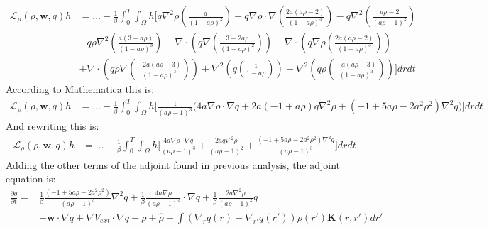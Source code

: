 \documentclass[11pt, a4paper]{article}
\theoremstyle{definition}
\newcommand{\w}{\mathbf{w}}
\newcommand{\K}{\mathbf{K}}
\newcommand{\hr}{\widehat \rho}
\begin{document}
\begin{align*}
	\mathcal{L}_\rho(\rho,\w,q)h &=... -\frac{1}{\beta}\int_0^T\int_\Omega h \bigg[  q\nabla^2 \rho \left(\frac{a}{(1- a\rho)^2}\right)  + q \nabla \rho \cdot \nabla \left(\frac{2a(a \rho -2)}{(1-a\rho)^3} \right) - q \nabla^2 \left(\frac{a\rho -2}{(a\rho -1)^2}\right)\\
	& - q\rho  \nabla^2  \left(\frac{a(3  - a \rho)}{(1-a\rho)^3} \right) -\nabla \cdot \left( q  \nabla \left( \frac{3-2a\rho}{(1-a\rho)^2} \right) \right)  - \nabla \cdot \left( q \nabla \rho  \left(\frac{2a(a \rho -2)}{(1-a\rho)^3}  \right)\right)  \\
	&  + \nabla \cdot\left( q\rho \nabla \left( \frac{-2a(a \rho- 3)}{(1-a\rho)^3} \right) \right)+   \nabla^2 \left(q \left(\frac{1}{1- a\rho} \right) \right) - \nabla^2 \left(q\rho \left(\frac{-a(a \rho -3)}{(1-a\rho)^3} \right)\right)\bigg] dr dt 
\end{align*}
According to Mathematica this is:
\begin{align*}
	\mathcal{L}_\rho(\rho,\w,q)h &=... -\frac{1}{\beta}\int_0^T\int_\Omega h \bigg[ 
	\frac{1}{(a \rho -1)^3}\bigg(4 a \nabla \rho \cdot \nabla q + 
	2 a (-1 + a \rho) q \nabla^2 \rho + (-1 + 5 a \rho - 2 a^2 \rho^2) \nabla^2 q\bigg)
	\bigg] dr dt
\end{align*}
And rewriting this is:
\begin{align*}
	\mathcal{L}_\rho(\rho,\w,q)h & =... -\frac{1}{\beta}\int_0^T\int_\Omega h \bigg[ 
	\frac{4 a \nabla \rho \cdot \nabla q}{(a \rho -1)^3}  +   \frac{2 a  q \nabla^2 \rho}{(a \rho -1)^2}  +   \frac{(-1 + 5 a \rho - 2 a^2 \rho^2) \nabla^2 q}{(a \rho -1)^3}
	\bigg] dr dt
\end{align*}
Adding the other terms of the adjoint found in previous analysis, the adjoint equation is:
\begin{align*}
	\frac{\partial q}{\partial t} =&\frac{1}{\beta}\frac{(-1 + 5 a \rho - 2 a^2 \rho^2) }{(a \rho -1)^3}\nabla^2 q +\frac{1}{\beta} \frac{4 a \nabla \rho }{(a \rho -1)^3}\cdot \nabla q +  \frac{1}{\beta} \frac{2 a   \nabla^2 \rho}{(a \rho -1)^2} q    \\
	&- \w \cdot \nabla q + \nabla V_{ext} \cdot \nabla q - \rho + \hr + \int \left(\nabla_r q(r) - \nabla_{r'} q(r') \right) \rho(r') \K(r,r') dr'
\end{align*}
\end{document}
